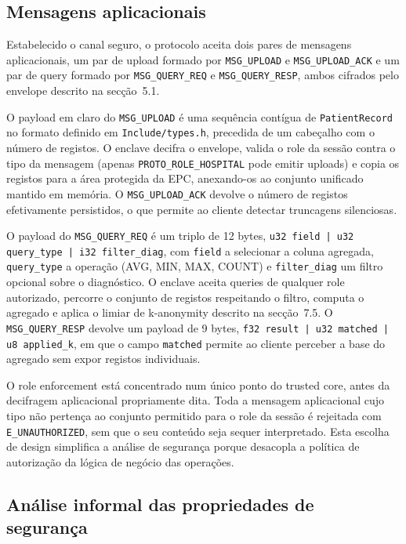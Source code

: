 \subsection{Mensagens aplicacionais}

Estabelecido o canal seguro, o protocolo aceita dois pares de mensagens aplicacionais, um par de upload formado por \texttt{MSG\_UPLOAD} e \texttt{MSG\_UPLOAD\_ACK} e um par de query formado por \texttt{MSG\_QUERY\_REQ} e \texttt{MSG\_QUERY\_RESP}, ambos cifrados pelo envelope descrito na secção~5.1.

O payload em claro do \texttt{MSG\_UPLOAD} é uma sequência contígua de \texttt{PatientRecord} no formato definido em \texttt{Include/types.h}, precedida de um cabeçalho com o número de registos. O enclave decifra o envelope, valida o role da sessão contra o tipo da mensagem (apenas \texttt{PROTO\_ROLE\_HOSPITAL} pode emitir uploads) e copia os registos para a área protegida da EPC, anexando-os ao conjunto unificado mantido em memória. O \texttt{MSG\_UPLOAD\_ACK} devolve o número de registos efetivamente persistidos, o que permite ao cliente detectar truncagens silenciosas.

O payload do \texttt{MSG\_QUERY\_REQ} é um triplo de 12 bytes, \texttt{u32 field | u32 query\_type | i32 filter\_diag}, com \texttt{field} a selecionar a coluna agregada, \texttt{query\_type} a operação (AVG, MIN, MAX, COUNT) e \texttt{filter\_diag} um filtro opcional sobre o diagnóstico. O enclave aceita queries de qualquer role autorizado, percorre o conjunto de registos respeitando o filtro, computa o agregado e aplica o limiar de k-anonymity descrito na secção~7.5. O \texttt{MSG\_QUERY\_RESP} devolve um payload de 9 bytes, \texttt{f32 result | u32 matched | u8 applied\_k}, em que o campo \texttt{matched} permite ao cliente perceber a base do agregado sem expor registos individuais.

O role enforcement está concentrado num único ponto do trusted core, antes da decifragem aplicacional propriamente dita. Toda a mensagem aplicacional cujo tipo não pertença ao conjunto permitido para o role da sessão é rejeitada com \texttt{E\_UNAUTHORIZED}, sem que o seu conteúdo seja sequer interpretado. Esta escolha de design simplifica a análise de segurança porque desacopla a política de autorização da lógica de negócio das operações.

\subsection{Análise informal das propriedades de segurança}

